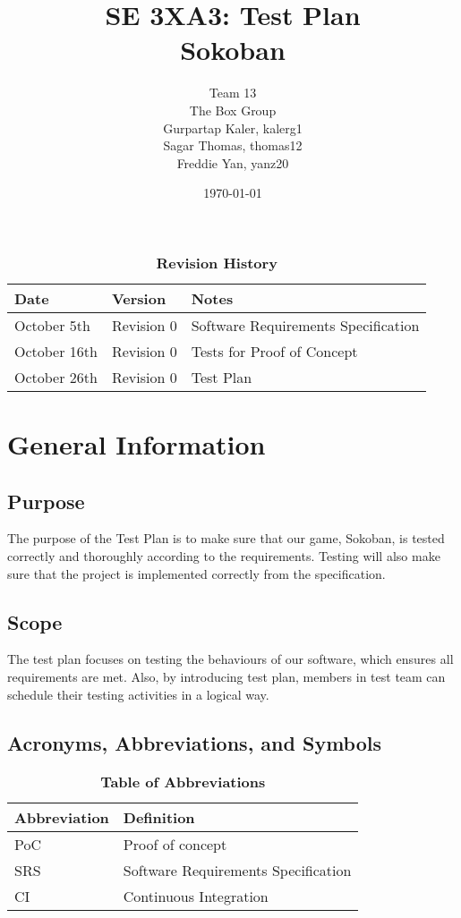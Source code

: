 \documentclass[12pt, titlepage]{article}
\title{SE 3XA3: Test Plan
        \\Sokoban}
\author{Team 13
        \\The Box Group
		\\ Gurpartap Kaler, kalerg1
		\\ Sagar Thomas, thomas12
		\\ Freddie Yan, yanz20
}
\date{\today}
\begin{document}
\maketitle

\tableofcontents
\listoftables
\listoffigures

\begin{table}[bp]
\caption{\bf Revision History}
\begin{tabularx}{\textwidth}{p{3cm}p{2cm}X}
\toprule {\bf Date} & {\bf Version} & {\bf Notes}\\
\midrule
October 5th & Revision 0 & Software Requirements Specification\\
October 16th & Revision 0  & Tests for Proof of Concept\\
October 26th & Revision 0 & Test Plan\\
\bottomrule
\end{tabularx}
\end{table}

\newpage



\section{General Information}

\subsection{Purpose}

The purpose of the Test Plan is to make sure that our game, Sokoban, is tested correctly and thoroughly according to the requirements. Testing will also make sure that the project is implemented correctly from the specification.

\subsection{Scope}
The test plan focuses on testing the behaviours of our software, which ensures all requirements are met. Also, by introducing test plan, members in test team can schedule their testing activities in a logical way.


\subsection{Acronyms, Abbreviations, and Symbols}
	
\begin{table}[hbp]
\caption{\textbf{Table of Abbreviations}} \label{Table}

\begin{tabularx}{\textwidth}{p{3cm}X}
\toprule
\textbf{Abbreviation} & \textbf{Definition} \\
\midrule
PoC & Proof of concept\\
SRS & Software Requirements Specification\\
CI & Continuous Integration \\
\bottomrule
\end{tabularx}

\end{table}
\end{document}
